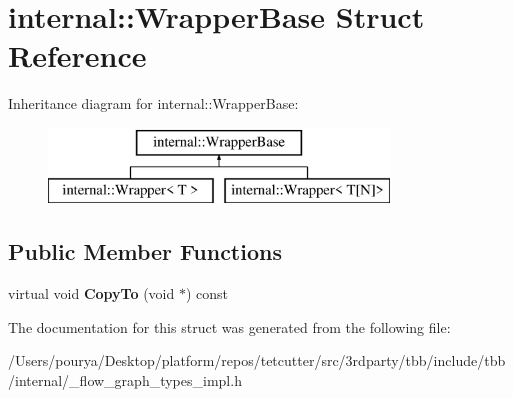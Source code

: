 \hypertarget{structinternal_1_1WrapperBase}{}\section{internal\+:\+:Wrapper\+Base Struct Reference}
\label{structinternal_1_1WrapperBase}
Inheritance diagram for internal\+:\+:Wrapper\+Base\+:\begin{figure}[H]
\begin{center}
\leavevmode
\includegraphics[height=2.000000cm]{structinternal_1_1WrapperBase}
\end{center}
\end{figure}
\subsection*{Public Member Functions}
\begin{DoxyCompactItemize}
\item 
\hypertarget{structinternal_1_1WrapperBase_a6695822e1ba255616d551385d7ec2684}{}virtual void {\bfseries Copy\+To} (void $\ast$) const \label{structinternal_1_1WrapperBase_a6695822e1ba255616d551385d7ec2684}

\end{DoxyCompactItemize}


The documentation for this struct was generated from the following file\+:\begin{DoxyCompactItemize}
\item 
/\+Users/pourya/\+Desktop/platform/repos/tetcutter/src/3rdparty/tbb/include/tbb/internal/\+\_\+flow\+\_\+graph\+\_\+types\+\_\+impl.\+h\end{DoxyCompactItemize}
